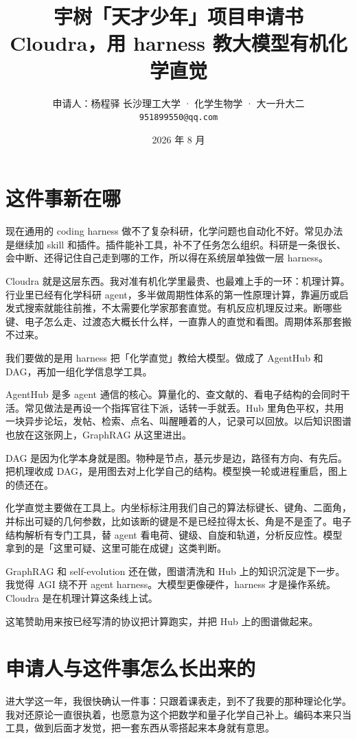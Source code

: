 \documentclass[11pt,a4paper]{article}
\title{\vspace{-1.6em}\textbf{宇树「天才少年」项目申请书}\\[0.4em]
\large Cloudra，用 harness 教大模型有机化学直觉}
\author{申请人：杨程驿 \quad 长沙理工大学 · 化学生物学 · 大一升大二\\
\texttt{951899550@qq.com}}
\date{2026 年 8 月}
\begin{document}
\maketitle
\vspace{-1em}

\section{这件事新在哪}
现在通用的 coding harness 做不了复杂科研，化学问题也自动化不好。常见办法是继续加 skill 和插件。插件能补工具，补不了任务怎么组织。科研是一条很长、会中断、还得记住自己走到哪的工作，所以得在系统层单独做一层 harness。

Cloudra 就是这层东西。我对准有机化学里最贵、也最难上手的一环：机理计算。行业里已经有化学科研 agent，多半做周期性体系的第一性原理计算，靠遍历或启发式搜索就能往前推，不太需要化学家那套直觉。有机反应机理反过来。断哪些键、电子怎么走、过渡态大概长什么样，一直靠人的直觉和看图。周期体系那套搬不过来。

我们要做的是用 harness 把「化学直觉」教给大模型。做成了 AgentHub 和 DAG，再加一组化学信息学工具。

AgentHub 是多 agent 通信的核心。算量化的、查文献的、看电子结构的会同时干活。常见做法是再设一个指挥官往下派，话转一手就丢。Hub 里角色平权，共用一块异步论坛，发帖、检索、点名、叫醒睡着的人，记录可以回放。以后知识图谱也放在这张网上，GraphRAG 从这里进出。

DAG 是因为化学本身就是图。物种是节点，基元步是边，路径有方向、有先后。把机理收成 DAG，是用图去对上化学自己的结构。模型换一轮或进程重启，图上的债还在。

化学直觉主要做在工具上。内坐标标注用我们自己的算法标键长、键角、二面角，并标出可疑的几何参数，比如该断的键是不是已经拉得太长、角是不是歪了。电子结构解析有专门工具，替 agent 看电荷、键级、自旋和轨道，分析反应性。模型拿到的是「这里可疑、这里可能在成键」这类判断。

GraphRAG 和 self-evolution 还在做，图谱清洗和 Hub 上的知识沉淀是下一步。我觉得 AGI 绕不开 agent harness。大模型更像硬件，harness 才是操作系统。Cloudra 是在机理计算这条线上试。

这笔赞助用来按已经写清的协议把计算跑实，并把 Hub 上的图谱做起来。

\section{申请人与这件事怎么长出来的}
进大学这一年，我很快确认一件事：只跟着课表走，到不了我要的那种理论化学。我对还原论一直很执着，也愿意为这个把数学和量子化学自己补上。编码本来只当工具，做到后面才发觉，把一套东西从零搭起来本身就有意思。
\end{document}
